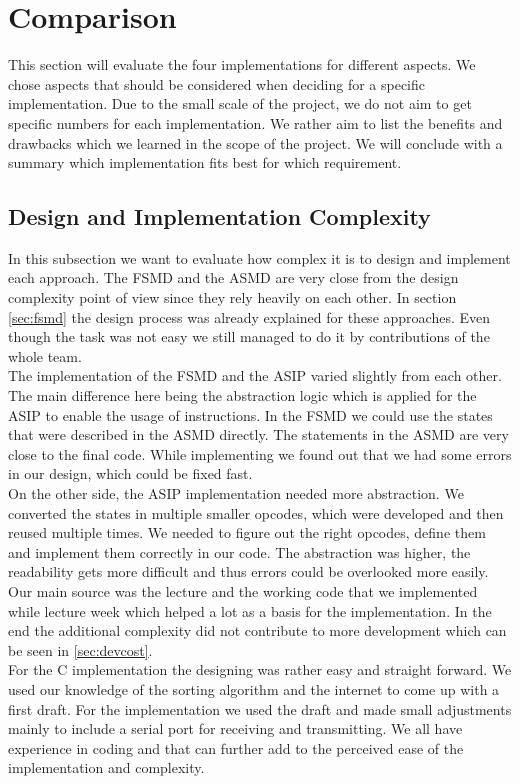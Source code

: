 \documentclass[conference]{IEEEtran}
\begin{document}
\section{Comparison}
This section will evaluate the four implementations for different aspects. We chose aspects that should be considered when deciding for a specific implementation. Due to the small scale of the project, we do not aim to get specific numbers for each implementation. We rather aim to list the benefits and drawbacks which we learned in the scope of the project. We will conclude with a summary which implementation fits best for which requirement.

\subsection{Design and Implementation Complexity}
In this subsection we want to evaluate how complex it is to design and implement each approach. The FSMD and the ASMD are very close from the design complexity point of view since they rely heavily on each other. In section \ref{sec:fsmd} the design process was already explained for these approaches. Even though the task was not easy we still managed to do it by contributions of the whole team.\\
The implementation of the FSMD and the ASIP varied slightly from each other. The main difference here being the abstraction logic which is applied for the ASIP to enable the usage of instructions. In the FSMD we could use the states that were described in the ASMD directly. The statements in the ASMD are very close to the final code. While implementing we found out that we had some errors in our design, which could be fixed fast.\\ 
On the other side, the ASIP implementation needed more abstraction. We converted the states in multiple smaller opcodes, which were developed and then reused multiple times. We needed to figure out the right opcodes, define them and implement them correctly in our code. The abstraction was higher, the readability gets more difficult and thus errors could be overlooked more easily. Our main source was the lecture and the working code that we implemented while lecture week which helped a lot as a basis for the implementation. In the end the additional complexity did not contribute to more development which can be seen in \ref{sec:devcost}.\\
For the C implementation the designing was rather easy and straight forward. We used our knowledge of the sorting algorithm and the internet to come up with a first draft. For the implementation we used the draft and made small adjustments mainly to include a serial port for receiving and transmitting. We all have experience in coding and that can further add to the perceived ease of the implementation and complexity. \\
\end{document}
